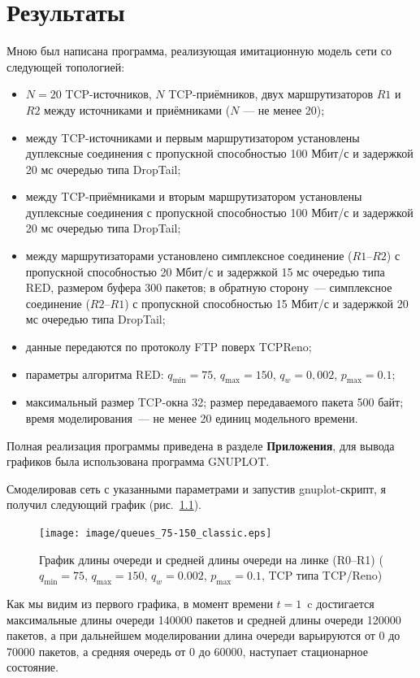 \chapter{Результаты}

Мною был написана программа, реализующая имитационную модель сети со следующей топологией:
\begin{itemize}
\item $N=20$ TCP-источников, $N$ TCP-приёмников, двух маршрутизаторов $R1$
  и $R2$ между источниками и приёмниками ($N$ — не менее 20);
\item между TCP-источниками и первым маршрутизатором установлены
  дуплексные соединения с пропускной способностью 100 Мбит/с и
  задержкой 20 мс очередью типа DropTail;
\item между TCP-приёмниками и вторым маршрутизатором установлены
  дуплексные соединения с пропускной способностью 100 Мбит/с и
  задержкой 20 мс очередью типа DropTail;
\item между маршрутизаторами установлено симплексное соединение
  ($R1$--$R2$) с пропускной способностью 20 Мбит/с и задержкой 15 мс
  очередью типа RED, размером буфера 300 пакетов; в обратную сторону~---
  симплексное соединение ($R2$--$R1$) с пропускной способностью 15 Мбит/с и
  задержкой 20 мс очередью типа DropTail;
\item данные передаются по протоколу FTP поверх TCPReno;
\item параметры алгоритма RED: $q_{\min}=75$, $q_{\max}=150$, $q_w=0,002$, $p_{\max}=0.1$;
\item максимальный размер TCP-окна 32; размер передаваемого пакета 500
  байт; время моделирования~--- не менее 20 единиц модельного времени.
\end{itemize}

Полная реализация программы приведена в разделе \textbf{Приложения},
для вывода графиков была использована программа GNUPLOT.

Смоделировав сеть с указанными параметрами и запустив gnuplot-скрипт,
я получил следующий график (рис.~\ref{fig:3.1}).

\begin{figure}[!ht]
  \centering
  \texttt{[image: image/queues\_75-150\_classic.eps]}
  \caption{График длины очереди и средней длины очереди на
    линке (R0--R1) ($q_{\min}=75$, $q_{\max}=150$, $q_w=0.002$, $p_{\max}=0.1$,
    TCP типа TCP/Reno)}
  \label{fig:3.1}
\end{figure}

Как мы видим из первого графика, в момент времени $t=1$~c достигается
максимальные длины очереди 140000 пакетов и средней длины очереди
120000 пакетов, а при дальнейшем моделировании длина очереди
варьируются от 0 до 70000 пакетов, а средняя очередь от 0 до 60000,
наступает стационарное состояние.

